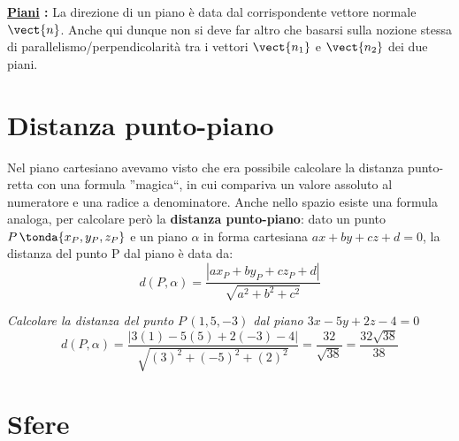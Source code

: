 \vspace{7pt}

\textbf{\underline{Piani} :} \; La direzione di un piano è data dal corrispondente vettore normale $\vect{n}$. Anche qui dunque non si deve far altro che basarsi sulla nozione stessa di parallelismo/perpendicolarità tra i vettori $\vect{n_1}$ e $\vect{n_2}$ dei due piani.

\section{Distanza punto-piano}

Nel piano cartesiano avevamo visto che era possibile calcolare la distanza punto-retta con una formula ''magica``, in cui compariva un valore assoluto al numeratore e una radice a denominatore. Anche nello spazio esiste una formula analoga, per calcolare però la \textbf{distanza punto-piano}: dato un punto $P\,\tonda{x_P,y_P,z_P}$ e un piano $\alpha$ in forma cartesiana $ax+by+cz+d=0$, la distanza del punto P dal piano è data da:
\[d(P,\alpha) = \frac{|ax_P+by_P+cz_P+d|}{\sqrt{a^2+b^2+c^2}}\]
\begin{esempio}
 \emph{Calcolare la distanza del punto $P\,(1,5,-3)$ dal piano $3x-5y+2z-4=0$}\\[5pt]
 \[d(P,\alpha)=\frac{|3 (1)-5(5)+2(-3)-4|}{\sqrt{(3)^2+(-5)^2+(2)^2}} = \frac{32}{\sqrt{38}} = \frac{32 \sqrt{38}}{38}\]
\end{esempio}



\section{Sfere}

